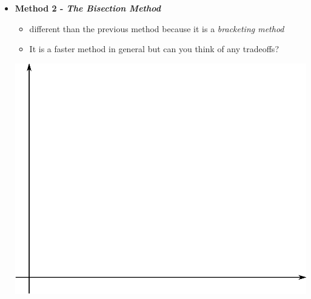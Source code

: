 \documentclass[11pt]{article}
\begin{document}
\begin{itemize}
		\newpage
		\item \textbf{ \LARGE Method 2 - {\it The Bisection Method} } \\
			\begin{itemize}
				\item different than the previous method because it is a {\it bracketing method}\\
				\item It is a faster method in general but can you think of any tradeoffs?\\ \vspace{20mm}
			\end{itemize}
	\includegraphics[scale=.5]{lecture1_fig5.png}


\end{itemize}
\end{document}
